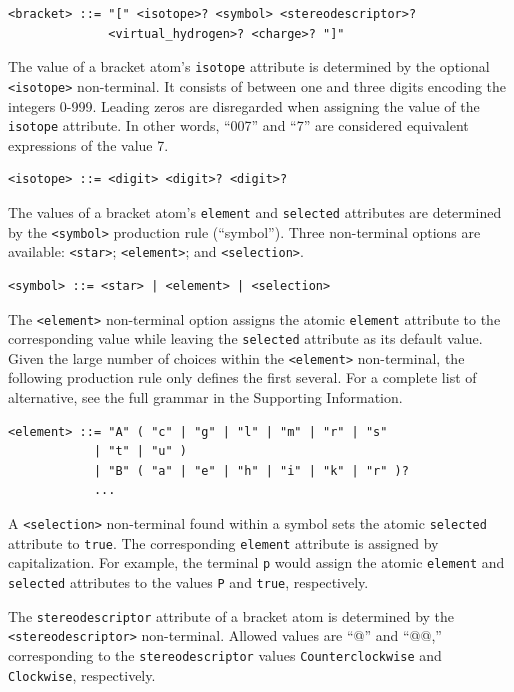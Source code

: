 \documentclass{article}
\def\ttt{\texttt}
\begin{document}
\begin{lstlisting}
<bracket> ::= "[" <isotope>? <symbol> <stereodescriptor>?
              <virtual_hydrogen>? <charge>? "]"
\end{lstlisting}

The value of a bracket atom's \ttt{isotope} attribute is determined by the optional \ttt{<isotope>} non-terminal. It consists of between one and three digits encoding the integers 0-999. Leading zeros are disregarded when assigning the value of the \ttt{isotope} attribute. In other words, \enquote{007} and \enquote{7} are considered equivalent expressions of the value 7.

\begin{lstlisting}
<isotope> ::= <digit> <digit>? <digit>?
\end{lstlisting}

The values of a bracket atom's \ttt{element} and \ttt{selected} attributes are determined by the \ttt{<symbol>} production rule (\enquote{symbol}). Three non-terminal options are available: \ttt{<star>}; \ttt{<element>}; and \ttt{<selection>}.

\begin{lstlisting}
<symbol> ::= <star> | <element> | <selection>
\end{lstlisting}

The \ttt{<element>} non-terminal option assigns the atomic \ttt{element} attribute to the corresponding value while leaving the \ttt{selected} attribute as its default value. Given the large number of choices within the \ttt{<element>} non-terminal, the following production rule only defines the first several. For a complete list of alternative, see the full grammar in the Supporting Information.

\begin{lstlisting}
<element> ::= "A" ( "c" | "g" | "l" | "m" | "r" | "s"
            | "t" | "u" )
            | "B" ( "a" | "e" | "h" | "i" | "k" | "r" )?
            ...
\end{lstlisting}

A \ttt{<selection>} non-terminal found within a symbol sets the atomic \ttt{selected} attribute to \ttt{true}. The corresponding \ttt{element} attribute is assigned by capitalization. For example, the terminal \ttt{p} would assign the atomic \ttt{element} and \ttt{selected} attributes to the values \ttt{P} and \ttt{true}, respectively.

The \ttt{stereodescriptor} attribute of a bracket atom is determined by the \ttt{<stereodescriptor>} non-terminal. Allowed values are \enquote{@} and \enquote{@@,} corresponding to the \ttt{stereodescriptor} values \ttt{Counterclockwise} and \ttt{Clockwise}, respectively.
\end{document}
